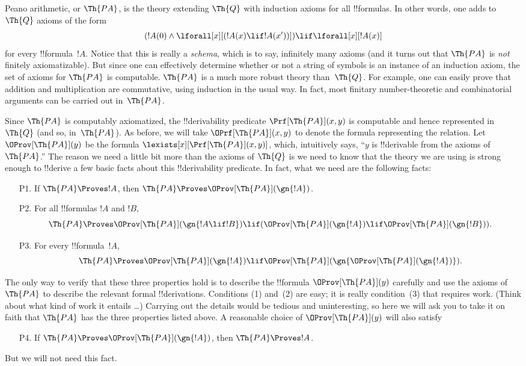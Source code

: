 \documentclass[../../../include/open-logic-section]{subfiles}
\begin{document}

Peano arithmetic, or $\Th{PA}$, is the theory extending $\Th{Q}$ with
induction axioms for all !!{formula}s. In other words, one adds to $\Th{Q}$
axioms of the form
\[
(!A(0) \land \lforall[x][(!A(x) \lif !A(x'))]) \lif \lforall[x][!A(x)]
\]
for every !!{formula}~$!A$. Notice that this is really a
\emph{schema}, which is to say, infinitely many axioms (and it turns
out that $\Th{PA}$ is {\em not} finitely axiomatizable). But since one
can effectively determine whether or not a string of symbols is an
instance of an induction axiom, the set of axioms for $\Th{PA}$ is
computable. $\Th{PA}$ is a much more robust theory than~$\Th{Q}$. For
example, one can easily prove that addition and multiplication are
commutative, using induction in the usual way. In fact, most finitary
number-theoretic and combinatorial arguments can be carried out
in~$\Th{PA}$.

Since $\Th{PA}$ is computably axiomatized, the !!{derivability}
predicate $\Prf[\Th{PA}](x,y)$ is computable and hence represented
in~$\Th{Q}$ (and so, in~$\Th{PA}$). As before, we will take
$\OPrf[\Th{PA}](x,y)$ to denote the formula representing the relation.
Let $\OProv[\Th{PA}](y)$ be the formula
$\lexists[x][\Prf[\Th{PA}](x,y)]$, which, intuitively says, ``$y$ is
!!{derivable} from the axioms of $\Th{PA}$.''  The reason we need a
little bit more than the axioms of $\Th{Q}$ is we need to know that
the theory we are using is strong enough to !!{derive} a few basic
facts about this !!{derivability} predicate. In fact, what we need are
the following facts:
\begin{enumerate}
\item[P1.] If $\Th{PA} \Proves !A$, then $\Th{PA} \Proves
  \OProv[\Th{PA}](\gn{!A})$.
\item[P2.] For all !!{formula}s $!A$ and $!B$,
  \[
  \Th{PA} \Proves \OProv[\Th{PA}](\gn{!A \lif !B}) \lif
  (\OProv[\Th{PA}](\gn{!A}) \lif \OProv[\Th{PA}](\gn{!B})).
  \]
\item[P3.] For every !!{formula}~$!A$,
  \[
  \Th{PA} \Proves \OProv[\Th{PA}](\gn{!A})
  \lif \OProv[\Th{PA}](\gn{\OProv[\Th{PA}](\gn{!A})}).
  \]
\end{enumerate}
The only way to verify that these three properties hold is to describe
the !!{formula} $\OProv[\Th{PA}](y)$ carefully and use the axioms of
$\Th{PA}$ to describe the relevant formal !!{derivation}s. Conditions (1)
and~(2) are easy; it is really condition~(3) that requires
work. (Think about what kind of work it entails \dots) Carrying out the
details would be tedious and uninteresting, so here we will ask you to
take it on faith that $\Th{PA}$ has the three properties listed
above. A reasonable choice of $\OProv[\Th{PA}](y)$ will also satisfy
\begin{enumerate}
\item[P4.] If $\Th{PA} \Proves \OProv[\Th{PA}](\gn{!A})$, then
  $\Th{PA} \Proves !A$.
\end{enumerate}
But we will not need this fact.
\end{document}
